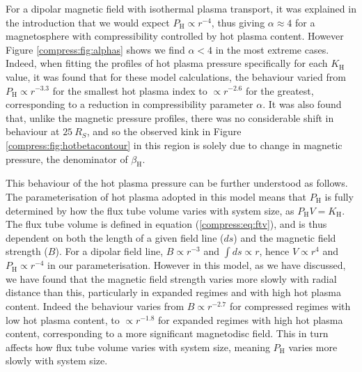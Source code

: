 For a dipolar magnetic field with isothermal plasma transport, it was explained in the introduction that we would expect $P_\mathrm{H} \propto r^{-4}$, thus giving $\alpha \approx 4$ for a magnetosphere with compressibility controlled by hot plasma content. However Figure \ref{compress:fig:alphas} shows we find $\alpha < 4$ in the most extreme cases. Indeed, when fitting the profiles of hot plasma pressure specifically for each $K_\mathrm{H}$ value, it was found that for these model calculations, the behaviour varied from $P_\mathrm{H} \propto r^{-3.3}$ for the smallest hot plasma index to $\propto r^{-2.6}$ for the greatest, corresponding to a reduction in compressibility parameter $\alpha$. It was also found that, unlike the magnetic pressure profiles, there was no considerable shift in behaviour at $\SI{25}{R_S}$, and so the observed kink in Figure \ref{compress:fig:hotbetacontour} in this region is solely due to change in magnetic pressure, the denominator of $\beta_\mathrm{H}$.

This behaviour of the hot plasma pressure can be further understood as follows. The parameterisation of hot plasma adopted in this model means that $P_\mathrm{H}$ is fully determined by how the flux tube volume varies with system size, as $P_\mathrm{H}V=K_\mathrm{H}$. The flux tube volume is defined in equation (\ref{compress:eq:ftv}), and is thus dependent on both the length of a given field line ($ds$) and the magnetic field strength ($B$). For a dipolar field line, $B \propto r^{-3}$ and $\int ds \propto r$, hence $V \propto r^4$ and $P_\mathrm{H} \propto r^{-4}$ in our parameterisation. However in this model, as we have discussed, we have found that the magnetic field strength varies more slowly with radial distance than this, particularly in expanded regimes and with high hot plasma content. Indeed the behaviour varies from $B \propto r^{-2.7}$ for compressed regimes with low hot plasma content, to $\propto r^{-1.8}$ for expanded regimes with high hot plasma content, corresponding to a more significant magnetodisc field. This in turn affects how flux tube volume varies with system size, meaning $P_\mathrm{H}$ varies more slowly with system size.

